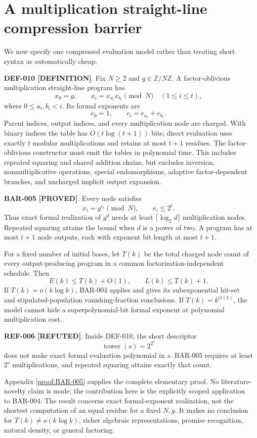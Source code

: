 \documentclass[11pt]{article}
\newcommand{\claimstatus}[2]{\textbf{#1 [#2]}}
\begin{document}
\section{A multiplication straight-line compression barrier}

We now specify one compressed evaluation model rather than treating short
syntax as automatically cheap.

\claimstatus{DEF-010}{DEFINITION}. Fix \(N\ge2\) and
\(g\in\mathbb Z/N\mathbb Z\). A factor-oblivious multiplication straight-line
program has
\[
x_0=g,\qquad
x_i=x_{a_i}x_{b_i}\pmod N
\quad(1\le i\le t),
\]
where \(0\le a_i,b_i<i\). Its formal exponents are
\[
e_0=1,\qquad e_i=e_{a_i}+e_{b_i}.
\]
Parent indices, output indices, and every multiplication node are charged.
With binary indices the table has \(O(t\log(t+1))\) bits; direct evaluation
uses exactly \(t\) modular multiplications and retains at most \(t+1\)
residues. The factor-oblivious constructor must emit the tables in polynomial
time. This includes repeated squaring and shared addition chains, but excludes
inversion, nonmultiplicative operations, special endomorphisms, adaptive
factor-dependent branches, and uncharged implicit output expansion.

\claimstatus{BAR-005}{PROVED}. Every node satisfies
\[
x_i=g^{e_i}\pmod N,\qquad e_i\le2^i.
\]
Thus exact formal realization of \(g^d\) needs at least
\(\lceil\log_2d\rceil\) multiplication nodes. Repeated squaring attains the
bound when \(d\) is a power of two. A program has at most \(t+1\) node
outputs, each with exponent bit length at most \(t+1\).

For a fixed number of initial bases, let \(T(k)\) be the total charged node
count of every output-producing program in a common factorization-independent
schedule. Then
\[
E(k)\le T(k)+O(1),\qquad L(k)\le T(k)+1.
\]
If \(T(k)=o(k\log k)\), BAR-004 applies and gives its subexponential hit-set
and stipulated-population vanishing-fraction conclusions. If
\(T(k)=k^{O(1)}\), the model cannot hide a superpolynomial-bit formal exponent
at polynomial multiplication cost.

\claimstatus{REF-006}{REFUTED}. Inside DEF-010, the short descriptor
\[
\operatorname{tower}(s)=2^{2^s}
\]
does not make exact formal evaluation polynomial in \(s\). BAR-005 requires
at least \(2^s\) multiplications, and repeated squaring attains exactly that
count.

Appendix \ref{proof:BAR-005} supplies the complete elementary proof. No
literature-novelty claim is made; the contribution here is the explicitly
scoped application to BAR-004. The result concerns exact formal-exponent
realization, not the shortest computation of an equal residue for a fixed
\(N,g\). It makes no conclusion for \(T(k)\not=o(k\log k)\), richer algebraic
representations, promise recognition, natural density, or general factoring.
\end{document}
